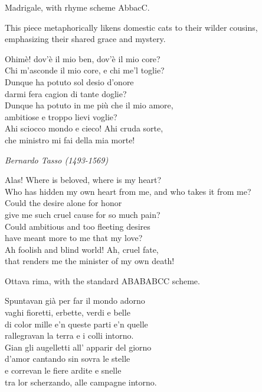 \documentclass[12pt, twocolumn]{text-translation}
\begin{document}
Madrigale, with rhyme scheme AbbacC.

This piece metaphorically likens domestic cats to their wilder cousins, emphasizing their shared grace and mystery.

Ohimè! dov'è il mio ben, dov'è il mio core?  \\
Chi m'asconde il mio core, e chi me'l toglie?  \\
Dunque ha potuto sol desio d'onore  \\
darmi fera cagion di tante doglie?  \\
Dunque ha potuto in me più che il mio amore,  \\
ambitiose e troppo lievi voglie?  \\
Ahi sciocco mondo e cieco! Ahi cruda sorte,  \\
che ministro mi fai della mia morte!  

{\raggedleft \textit{Bernardo Tasso (1493-1569)}\par}

\poemasterisks
Alas! Where is beloved, where is my heart? \\
Who has hidden my own heart from me, and who takes it from me? \\
Could the desire alone for honor \\
give me such cruel cause for so much pain? \\
Could ambitious and too fleeting desires \\
have meant more to me that my love? \\
Ah foolish and blind world! Ah, cruel fate, \\
that renders me the minister of my own death!

Ottava rima, with the standard ABABABCC scheme.

Spuntavan già per far il mondo adorno \\
vaghi fioretti, erbette, verdi e belle \\
di color mille e'n queste parti e'n quelle \\
rallegravan la terra e i colli intorno. \\
Gian gli augelletti all' apparir del giorno \\
d'amor cantando sin sovra le stelle \\
e correvan le fiere ardite e snelle \\
tra lor scherzando, alle campagne intorno. \\
\end{document}
